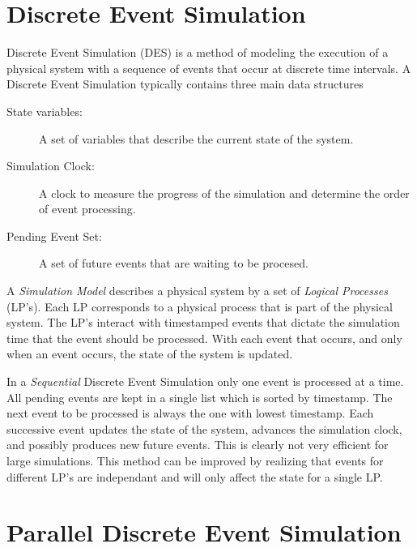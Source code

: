 \documentclass[11pt]{book}
\begin{document}
\section{Discrete Event Simulation}

Discrete Event Simulation (DES) is a method of modeling the execution of a physical system
with a sequence of events that occur at discrete time intervals. A Discrete Event Simulation
typically contains three main data structures

\begin{description}
    \item[State variables: ] A set of variables that describe the current state of the system.
    \item[Simulation Clock: ] A clock to measure the progress of the simulation and determine
        the order of event processing.
    \item[Pending Event Set: ] A set of future events that are waiting to be procesed.
\end{description}

\noindent
A \emph{Simulation Model} describes a physical system by a set of \emph{Logical Processes}
(LP's). Each LP corresponds to a physical process that is part of the physical system. The
LP's interact with timestamped events that dictate the simulation time that the event should
be processed. With each event that occurs, and only when an event occurs, the state of the
system is updated.

In a \emph{Sequential} Discrete Event Simulation only one event is processed at a time.
All pending events are kept in a single list which is sorted by timestamp. The next event
to be processed is always the one with lowest timestamp. Each successive event updates the
state of the system, advances the simulation clock, and possibly produces new future events.
This is clearly not very efficient for large simulations. This method can be improved by
realizing that events for different LP's are independant and will only affect the state for
a single LP.

\section{Parallel Discrete Event Simulation}
\end{document}
